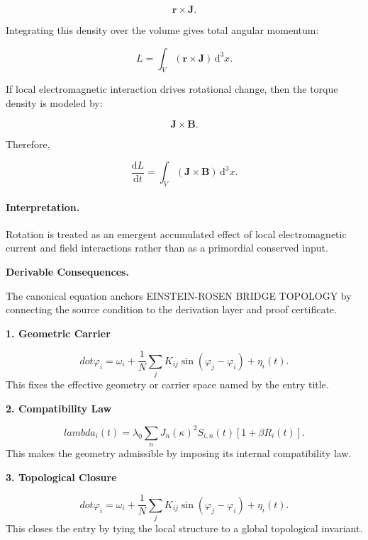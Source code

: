 \begin{equation}
\mathbf{r}\times\mathbf{J}.
\end{equation}

Integrating this density over the volume gives total angular momentum:

\begin{equation}
\boxed{
L
=
\int_V
(\mathbf{r}\times\mathbf{J})
\,\mathrm{d}^3x .
}
\end{equation}

If local electromagnetic interaction drives rotational change, then the torque density is modeled by:

\begin{equation}
\mathbf{J}\times\mathbf{B}.
\end{equation}

Therefore,

\begin{equation}
\boxed{
\frac{\mathrm{d}L}{\mathrm{d}t}
=
\int_V
(\mathbf{J}\times\mathbf{B})
\,\mathrm{d}^3x .
}
\end{equation}

\paragraph{Interpretation.}
Rotation is treated as an emergent accumulated effect of local electromagnetic current and field interactions rather than as a primordial conserved input.

\par\vspace{0.35em}
\noindent\textbf{Derivable Consequences.}\quad
\begingroup
\footnotesize
\raggedright
The canonical equation anchors EINSTEIN-ROSEN BRIDGE TOPOLOGY by connecting the source condition to the derivation layer and proof certificate.
\par\endgroup

\noindent\textbf{1. Geometric Carrier}\par
\[
dot\varphi_i = \omega_i + \frac{1}{N}\sum_j K_{ij}\sin(\varphi_j-\varphi_i) + \eta_i(t).
\]
\noindent This fixes the effective geometry or carrier space named by the entry title.\par
\noindent\textbf{2. Compatibility Law}\par
\[
lambda_i(t) = \lambda_0 \sum_n J_n(\kappa)^2 S_{i,n}(t) [1+\beta R_i(t)].
\]
\noindent This makes the geometry admissible by imposing its internal compatibility law.\par
\noindent\textbf{3. Topological Closure}\par
\[
dot\varphi_i = \omega_i + \frac{1}{N}\sum_j K_{ij}\sin(\varphi_j-\varphi_i) + \eta_i(t).
\]
\noindent This closes the entry by tying the local structure to a global topological invariant.\par

